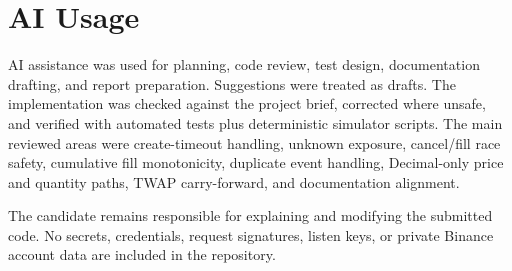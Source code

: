 \section{AI Usage}

AI assistance was used for planning, code review, test design, documentation drafting, and report preparation. Suggestions were treated as drafts. The implementation was checked against the project brief, corrected where unsafe, and verified with automated tests plus deterministic simulator scripts. The main reviewed areas were create-timeout handling, unknown exposure, cancel/fill race safety, cumulative fill monotonicity, duplicate event handling, Decimal-only price and quantity paths, TWAP carry-forward, and documentation alignment.

The candidate remains responsible for explaining and modifying the submitted code. No secrets, credentials, request signatures, listen keys, or private Binance account data are included in the repository.
